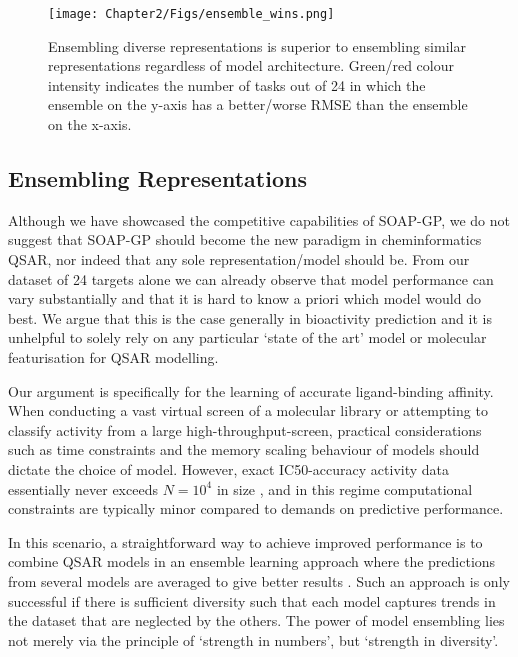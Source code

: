 
\begin{figure}[!h] %
\centering
\texttt{[image: Chapter2/Figs/ensemble\_wins.png]}
\caption{\label{fig:ensemble_mat} Ensembling diverse representations is superior to ensembling similar representations regardless of model architecture. Green/red colour intensity indicates the number of tasks out of 24 in which the ensemble on the y-axis has a better/worse RMSE than the ensemble on the x-axis.}
\end{figure}

\subsection{Ensembling Representations}
Although we have showcased the competitive capabilities of SOAP-GP, we do not suggest that SOAP-GP should become the new paradigm in cheminformatics QSAR, nor indeed that any sole representation/model should be. From our dataset of 24 targets alone we can already observe that model performance can vary substantially and that it is hard to know a priori which model would do best. We argue that this is the case generally in bioactivity prediction and it is unhelpful to solely rely on any particular `state of the art' model or molecular featurisation for QSAR modelling.

Our argument is specifically for the learning of accurate ligand-binding affinity. When conducting a vast virtual screen of a molecular library or attempting to classify activity from a large high-throughput-screen, practical considerations such as time constraints and the memory scaling behaviour of models should dictate the choice of model. However, exact IC50-accuracy activity data essentially never exceeds $N=10^{4}$ in size \cite{Cherkasov2014QSAR}, and in this regime computational constraints are typically minor compared to demands on predictive performance.

In this scenario, a straightforward way to achieve improved performance is to combine QSAR models in an ensemble learning approach where the predictions from several models are averaged to give better results \cite{Sagi2018ensemble}. Such an approach is only successful if there is sufficient diversity such that each model captures trends in the dataset that are neglected by the others. The power of model ensembling lies not merely via the principle of `strength in numbers', but `strength in diversity'.

